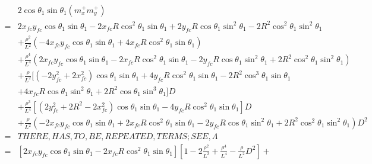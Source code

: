 \documentclass[12pt]{article}
\begin{document}
\begin{align}
    &2\cos\theta_1\sin\theta_1(m_x^+ m_y^+) \\
    =& 2x_{fc}y_{fc}\cos\theta_1\sin\theta_1 -2x_{fc}R\cos^2\theta_1\sin\theta_1 + 2y_{fc}R\cos\theta_1\sin^2\theta_1 -2R^2\cos^2\theta_1\sin^2\theta_1 \nonumber\\
    &+ \frac{\rho^2}{L^2}(-4x_{fc}y_{fc}\cos\theta_1\sin\theta_1 +4x_{fc}R\cos^2\theta_1\sin\theta_1) \nonumber\\
    &+ \frac{\rho^4}{L^4}(2x_{fc}y_{fc}\cos\theta_1\sin\theta_1 -2x_{fc}R\cos^2\theta_1\sin\theta_1 -2y_{fc}R\cos\theta_1\sin^2\theta_1 +2R^2\cos^2\theta_1\sin^2\theta_1) \nonumber\\
    &+ \frac{\rho}{L^2}[(-2y_{fc}^2 + 2x_{fc}^2)\cos\theta_1\sin\theta_1 + 4y_{fc}R\cos^2\theta_1\sin\theta_1 -2R^2\cos^3\theta_1\sin\theta_1 \nonumber\\
    &+ 4x_{fc}R\cos\theta_1\sin^2\theta_1 + 2R^2\cos\theta_1\sin^3\theta_1]D \nonumber\\
    &+ \frac{\rho^3}{L^4}[ (2y_{fc}^2 +2R^2 -2x_{fc}^2)\cos\theta_1\sin\theta_1 -4y_{fc}R\cos^2\theta_1\sin\theta_1 ]D \nonumber\\
    &+ \frac{\rho}{L^2}(-2x_{fc}y_{fc}\cos\theta_1\sin\theta_1 + 2x_{fc}R\cos^2\theta_1\sin\theta_1 -2y_{fc}R\cos\theta_1\sin^2\theta_1 +  2R^2\cos^2\theta_1\sin^2\theta_1 )D^2\\
    =& THERE,HAS,TO,BE,REPEATED,TERMS;SEE,\Lambda\\
    =& [2x_{fc}y_{fc}\cos\theta_1\sin\theta_1 -2x_{fc}R\cos^2\theta_1\sin\theta_1][ 1 -2\frac{\rho^2}{L^2} + \frac{\rho^4}{L^4} -  \frac{\rho}{L^2}D^2  ] + 
\end{align}
\end{document}
